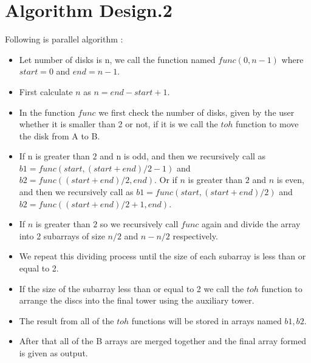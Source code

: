 \documentclass[conference]{IEEEtran}
\begin{document}
\section{Algorithm Design.2}
Following is parallel algorithm :

\begin{itemize}
\item Let number of disks is n, we call the function named $func(0,n-1)$ where $start=0$ and $end=n-1$.
\item First calculate $n$ as $n=end-start+1$.
\item In the function $func$ we first check the number of disks, given by the user whether it is smaller than 2 or not, if it is we call the $toh$ function to move the disk from A to B.
\item If n is greater than $2$ and n is odd, and then we recursively call as $b1=func(start,(start+end)/2-1)$ and $b2=func((start+end)/2,end)$.
 Or if $n$ is greater than $2$ and $n$ is even, and then we recursively call as $b1=func(start,(start+end)/2)$ and $b2=func((start+end)/2+1,end)$.
\item If $n$ is greater than $2$ so we recursively call $func$ again and divide the array into 2 subarrays of size $n/2$ and $n-n/2$ respectively. 
\item We repeat this dividing process until the size of each subarray is less than or equal to 2.
\item If the size of the subarray less than or equal to 2 we call the $toh$ function to arrange the discs into the final tower using the auxiliary tower.
\item The result from all of the $toh$ functions will be stored in arrays named $b1,b2$.
\item After that all of the B arrays are merged together and the final array formed is given as output.\\
\end{itemize}
\end{document}
